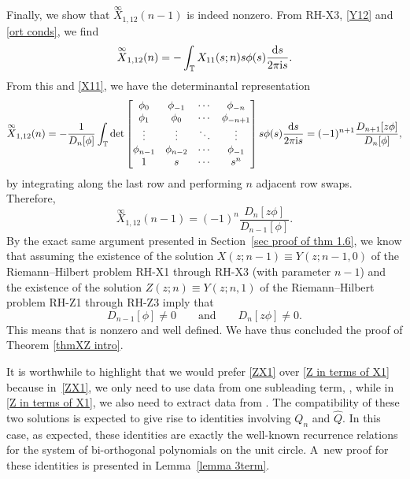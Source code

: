 \documentclass[pdftex]{sigma}
\numberwithin{equation}{section}
\newcommand{\T}{{\mathbb T}}
\newcommand{\ii}{{\rm i}}
\newcommand{\dd}{{\rm d}}
\newcommand{\qandq}{\qquad \text{and} \qquad}
\begin{document}
	Finally, we show that $\overset{\infty}{X}_{1,12}(n-1)$ is indeed nonzero. From {\rm RH-X3}, \eqref{Y12} and \eqref{ort conds}, we find
	\begin{equation*}
		\overset{\infty}{X}_{1,12}(n) = - 	\int_{\T} X_{11}(s;n)s\phi(s) \frac{\dd s}{2 \pi \ii s}.
	\end{equation*}
	From this and \eqref{X11}, we have the determinantal representation
	\begin{equation*}
		\overset{\infty}{X}_{1,12}(n) = - \frac{1}{D_n[\phi]}	\int_{\T} \det \begin{bmatrix}
			\phi_0 & \phi_{-1} & \cdots & \phi_{-n} \\
			\phi_1 & \phi_{0} & \cdots & \phi_{-n+1} \\
			\vdots & \vdots & \ddots & \vdots \\
			\phi_{n-1} & \phi_{n-2} & \cdots & \phi_{-1} \\
			1 & s & \cdots & s^n
		\end{bmatrix}s\phi(s) \frac{\dd s}{2 \pi \ii s} = (-1)^{n+1} \frac{D_{n+1}[z\phi]}{D_n[\phi]},
	\end{equation*} by integrating along the last row and performing $n$ adjacent row swaps. Therefore,
	\begin{equation*}
		\overset{\infty}{X}_{1,12}(n-1) = (-1)^{n} \frac{D_{n}[z\phi]}{D_{n-1}[\phi]}.
	\end{equation*}
	By the exact same argument presented in Section~\ref{sec proof of thm 1.6}, we know that assuming the existence of the solution $X(z;n-1) \equiv Y(z;n-1,0)$ of the Riemann--Hilbert problem {\rm RH-X1} through {\rm RH-X3} (with parameter $n-1$) and the existence of the solution $Z(z;n) \equiv Y(z;n,1)$ of the Riemann--Hilbert problem {\rm RH-Z1} through {\rm RH-Z3} imply that
	\begin{equation*}%
		D_{n-1}[\phi] \neq 0 \qandq D_n[z\phi] \neq 0.
	\end{equation*}
	This means that  is nonzero and well defined. We have thus concluded the proof of Theorem \ref{thmXZ intro}.
	\begin{Remark} 	It is worthwhile to highlight that we would prefer \eqref{ZX1} over \eqref{Z in terms of X1} because in~\eqref{ZX1}, we only need to use data from one subleading term, , while in \eqref{Z in terms of X1}, we also need to extract data from . The compatibility of these two solutions is expected to give rise to identities involving $Q_n$ and $\widehat{Q}$. In this case, as expected, these identities are exactly the well-known recurrence relations for the system of bi-orthogonal polynomials on the unit circle. A~new proof for these identities is presented in Lemma~\ref{lemma 3term}.
	\end{Remark}
	
\end{document}

